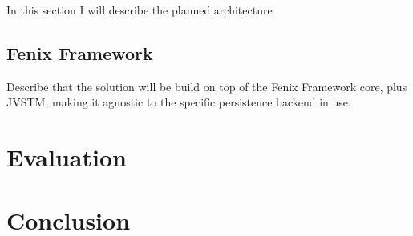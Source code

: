 \documentclass{llncs}
\begin{document}
In this section I will describe the planned architecture 

\subsection{Fenix Framework}

Describe that the solution will be build on top of the Fenix Framework
core, plus JVSTM, making it agnostic to the specific persistence
backend in use. 

\section{Evaluation}

\section{Conclusion}



\end{document}
